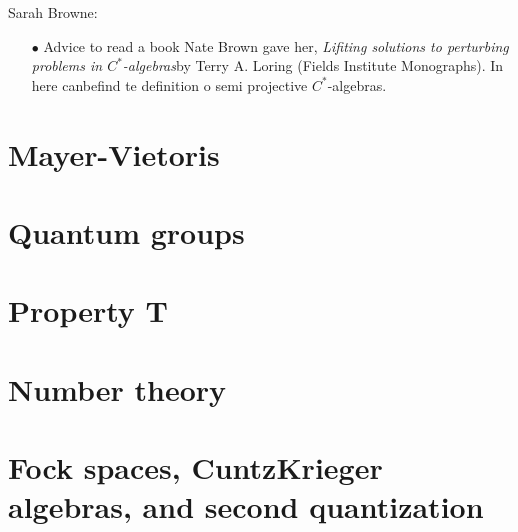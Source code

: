 Sarah Browne:\\

\begin{itemize}
\item[$\bullet$] Advice to read a book Nate Brown gave her, \textit{Lifiting solutions to perturbing problems in $C^*$-algebras}by Terry A. Loring (Fields Institute Monographs). In here canbefind te definition o semi projective $C^*$-algebras.
\end{itemize}

\section{Mayer-Vietoris}

\section{Quantum groups}

\section{Property T}

\section{Number theory}

\section{Fock spaces, CuntzKrieger algebras, and second quantization}













